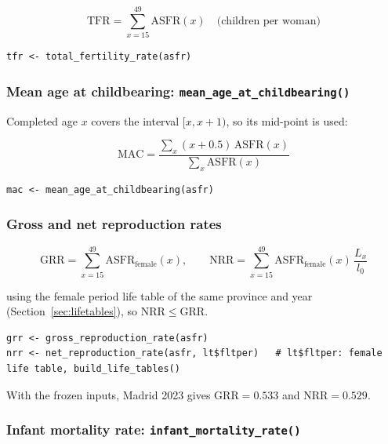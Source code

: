 \documentclass[11pt]{article}
\newcommand{\fn}[1]{\texttt{#1}}
\begin{document}
\begin{equation}
\mathrm{TFR} = \sum_{x=15}^{49} \mathrm{ASFR}(x) \quad \text{(children per woman)}
\end{equation}

\begin{lstlisting}
tfr <- total_fertility_rate(asfr)
\end{lstlisting}

\subsubsection{Mean age at childbearing: \fn{mean\_age\_at\_childbearing()}}

Completed age $x$ covers the interval $[x, x+1)$, so its mid-point is used:

\begin{equation}
\mathrm{MAC} = \frac{\sum_x (x + 0.5)\, \mathrm{ASFR}(x)}{\sum_x \mathrm{ASFR}(x)}
\end{equation}

\begin{lstlisting}
mac <- mean_age_at_childbearing(asfr)
\end{lstlisting}

\subsubsection{Gross and net reproduction rates}

\begin{equation}
\mathrm{GRR} = \sum_{x=15}^{49} \mathrm{ASFR}_{\text{female}}(x), \qquad
\mathrm{NRR} = \sum_{x=15}^{49} \mathrm{ASFR}_{\text{female}}(x)\, \frac{L_x}{l_0}
\end{equation}

using the female period life table of the same province and year
(Section~\ref{sec:lifetables}), so $\mathrm{NRR} \leq \mathrm{GRR}$.

\begin{lstlisting}
grr <- gross_reproduction_rate(asfr)
nrr <- net_reproduction_rate(asfr, lt$fltper)   # lt$fltper: female life table, build_life_tables()
\end{lstlisting}

With the frozen inputs, Madrid 2023 gives $\mathrm{GRR} = 0.533$ and
$\mathrm{NRR} = 0.529$.

\subsubsection{Infant mortality rate: \fn{infant\_mortality\_rate()}}
\end{document}
